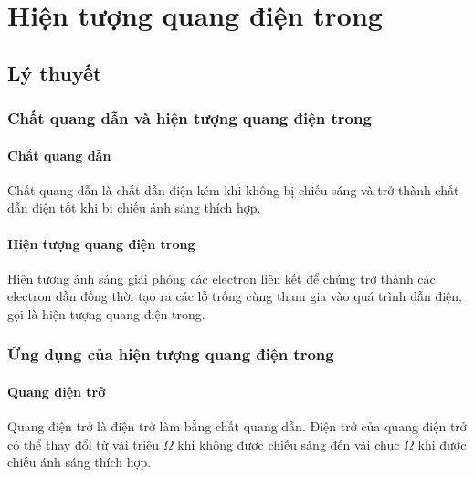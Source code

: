
\chapter[Hiện tượng quang điện trong]{Hiện tượng quang điện trong}

\section{Lý thuyết}
\subsection{Chất quang dẫn và hiện tượng quang điện trong}
\subsubsection{Chất quang dẫn}
Chất quang dẫn là chất dẫn điện kém khi không bị chiếu sáng và trở thành chất dẫn điện tốt khi bị chiếu ánh sáng thích hợp.
\subsubsection{Hiện tượng quang điện trong}
Hiện tượng ánh sáng giải phóng các electron liên kết để chúng trở thành các electron dẫn đồng thời tạo ra các lỗ trống cùng tham gia vào quá trình dẫn điện, gọi là hiện tượng quang điện trong.
\subsection{Ứng dụng của hiện tượng quang điện trong}
\subsubsection{Quang điện trở}
Quang điện trở là điện trở làm bằng chất quang dẫn. Điện trở của quang điện trở có thể thay đổi từ vài triệu $\Omega$ khi không được chiếu sáng đến vài chục $\Omega$ khi được chiếu ánh sáng thích hợp.
